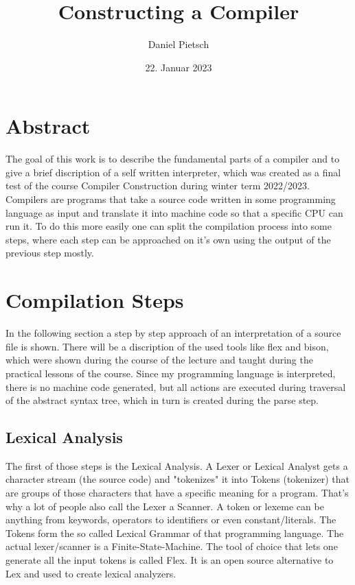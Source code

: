 \documentclass[a4paper, 11pt]{article}
\title{Constructing a Compiler}
\author{Daniel Pietsch}
\date{22. Januar 2023}
\begin{document}
\maketitle
\tableofcontents
\newpage

\section{Abstract}
The goal of this work is to describe the fundamental parts of a compiler and to give a brief discription of a self written interpreter, which was created as a final test of the course Compiler Construction during winter term 2022/2023.\\
Compilers are programs that take a source code written in some programming language as input and translate it into machine code so that a specific CPU can run it.
To do this more easily one can split the compilation process into some steps, where each step can be approached on it's own using the output of the previous step mostly.\\

\section{Compilation Steps}
In the following section a step by step approach of an interpretation of a source file is shown. There will be a discription of the used tools like flex and bison, which were shown during the course of the lecture and taught during the practical lessons of the course. Since my programming language is interpreted, there is no machine code generated, but all actions are executed during traversal of the abstract syntax tree, which in turn is created during the parse step.
\subsection{Lexical Analysis}
The first of those steps is the Lexical Analysis. A Lexer or Lexical Analyst gets a character stream (the source code) and "tokenizes" it into Tokens (tokenizer) that are groups of those characters that have a specific meaning for a program. That's why a lot of people also call the Lexer a Scanner. A token or lexeme can be anything from keywords, operators to identifiers or even constant/literals. The Tokens form the so called Lexical Grammar of that programming language. The actual lexer/scanner is a Finite-State-Machine. The tool of choice that lets one generate all the input tokens is called Flex. It is an open source alternative to Lex and used to create lexical analyzers.
\end{document}
